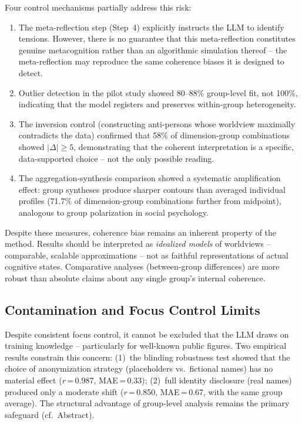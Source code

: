 \documentclass[11pt,a4paper]{article}
\begin{document}
Four control mechanisms partially address this risk:
\begin{enumerate}[nosep]
  \item The meta-reflection step (Step~4) explicitly instructs the LLM to identify tensions. However, there is no guarantee that this meta-reflection constitutes genuine metacognition rather than an algorithmic simulation thereof -- the meta-reflection may reproduce the same coherence biases it is designed to detect.
  \item Outlier detection in the pilot study showed 80--88\% group-level fit, not 100\%, indicating that the model registers and preserves within-group heterogeneity.
  \item The inversion control (constructing anti-persons whose worldview maximally contradicts the data) confirmed that 58\% of dimension-group combinations showed $|\Delta| \geq 5$, demonstrating that the coherent interpretation is a specific, data-supported choice -- not the only possible reading.
  \item The aggregation-synthesis comparison showed a systematic amplification effect: group syntheses produce sharper contours than averaged individual profiles (71.7\% of dimension-group combinations further from midpoint), analogous to group polarization in social psychology.
\end{enumerate}

Despite these measures, coherence bias remains an inherent property of the method. Results should be interpreted as \emph{idealized models} of worldviews -- comparable, scalable approximations -- not as faithful representations of actual cognitive states. Comparative analyses (between-group differences) are more robust than absolute claims about any single group's internal coherence.


\subsection{Contamination and Focus Control Limits}
\label{sec:limitations:contamination}

Despite consistent focus control, it cannot be excluded that the LLM draws on training knowledge -- particularly for well-known public figures. Two empirical results constrain this concern: (1)~the blinding robustness test showed that the choice of anonymization strategy (placeholders vs.\ fictional names) has no material effect ($r$\,=\,0.987, MAE\,=\,0.33); (2)~full identity disclosure (real names) produced only a moderate shift ($r$\,=\,0.850, MAE\,=\,0.67, with the same group average). The structural advantage of group-level analysis remains the primary safeguard (cf.\ Abstract).
\end{document}
